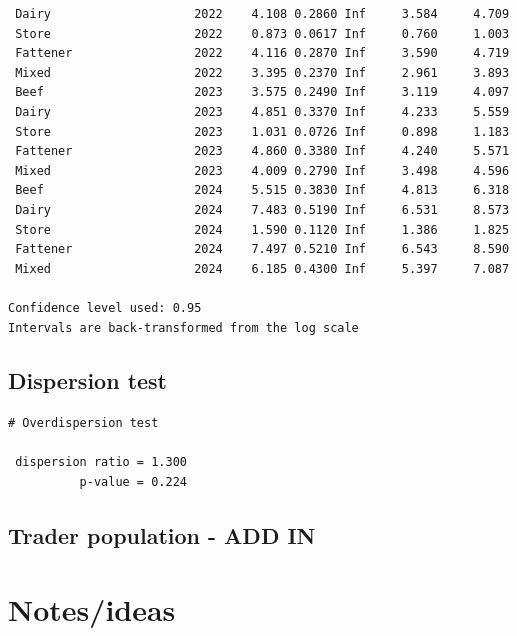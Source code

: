 \documentclass[
  letterpaper,
  DIV=11,
  numbers=noendperiod]{scrreprt}
\begin{document}
\begin{verbatim}
 Dairy                    2022    4.108 0.2860 Inf     3.584     4.709
 Store                    2022    0.873 0.0617 Inf     0.760     1.003
 Fattener                 2022    4.116 0.2870 Inf     3.590     4.719
 Mixed                    2022    3.395 0.2370 Inf     2.961     3.893
 Beef                     2023    3.575 0.2490 Inf     3.119     4.097
 Dairy                    2023    4.851 0.3370 Inf     4.233     5.559
 Store                    2023    1.031 0.0726 Inf     0.898     1.183
 Fattener                 2023    4.860 0.3380 Inf     4.240     5.571
 Mixed                    2023    4.009 0.2790 Inf     3.498     4.596
 Beef                     2024    5.515 0.3830 Inf     4.813     6.318
 Dairy                    2024    7.483 0.5190 Inf     6.531     8.573
 Store                    2024    1.590 0.1120 Inf     1.386     1.825
 Fattener                 2024    7.497 0.5210 Inf     6.543     8.590
 Mixed                    2024    6.185 0.4300 Inf     5.397     7.087

Confidence level used: 0.95 
Intervals are back-transformed from the log scale 
\end{verbatim}

\section{Dispersion test}\label{dispersion-test-1}

\begin{verbatim}
# Overdispersion test

 dispersion ratio = 1.300
          p-value = 0.224
\end{verbatim}

\section{Trader population - ADD IN}\label{trader-population---add-in}

\chapter{Notes/ideas}\label{notesideas}
\end{document}
